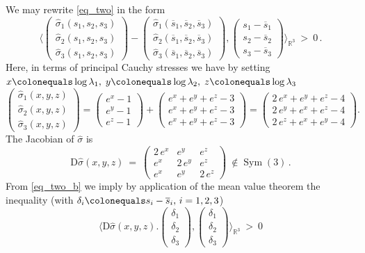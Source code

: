 \documentclass[10pt]{article}
\numberwithin{theoremCounter}{section}
\theoremstyle{plain}
\theoremstyle{definition}
\newcommand{\R}{\mathbb{R}}
\newcommand{\matr}[1]{\begin{pmatrix}#1\end{pmatrix}}
\newcommand{\DD}{\mathrm{D}}
\newcommand{\innerproduct}[1]{\langle #1 \rangle}
\newcommand{\iprod}{\innerproduct}
\DeclareMathOperator{\Sym}{Sym}
\numberwithin{equation}{section}
\begin{document}
\begin{appendix}
\begin{equation}
	 \end{equation}
We may rewrite \eqref{eq_two} in the form
	\begin{equation}\label{eq_two_b}
	\iprod{\matr{ \widehat\sigma_1(s_1,s_2,s_3)\\ \widehat\sigma_2(s_1,s_2,s_3)\\ \widehat\sigma_3(s_1,s_2,s_3)} - \matr{ \widehat\sigma_1(\overline s_1,\overline s_2,\overline s_3)\\ \widehat\sigma_2(\overline s_1,\overline s_2,\overline s_3)\\ \widehat\sigma_3(\overline s_1,\overline s_2,\overline s_3)} , \matr{s_1-\overline s_1 \\ s_2-\overline s_2 \\ s_3-\overline s_3} }_{\R^3}\ >\ 0\,.
	\end{equation}
Here, in terms of principal Cauchy stresses we have by setting $x\colonequals \log \lambda_1, \; y\colonequals \log \lambda_2, \; z\colonequals \log \lambda_3$
	\begin{equation}
	\begin{pmatrix} \widehat \sigma_1(x,y,z) \\ \widehat \sigma_2(x,y,z) \\ \widehat \sigma_3(x,y,z) \end{pmatrix} = \matr{e^x-1\\e^y-1\\e^z-1} + \matr{e^x + e^y + e^z - 3 \\ e^x + e^y + e^z - 3 \\ e^x + e^y + e^z - 3} = \matr{2\,e^x+e^y+e^z -4 \\ 2\,e^y + e^x+e^z - 4 \\ 2\,e^z + e^x+e^y - 4}.
	\end{equation}
The Jacobian of $ \widehat\sigma$ is
	\begin{equation}
	\DD \widehat\sigma(x,y,z)\ =\ \matr{ 2\,e^x & e^y & e^z \\ e^x & 2\,e^y & e^z \\ e^x & e^y & 2\,e^z}\ \not\in \Sym(3)\,.
	\end{equation}
From \eqref{eq_two_b} we imply by application of the mean value theorem the inequality (with $\delta_i \colonequals s_i - \overline s_i, \, i=1,2,3$)
	\begin{equation}\label{eq_three}
	\iprod{\DD \widehat\sigma(x,y,z) . \!\! \matr{\delta_1\\\delta_2\\\delta_3} \!,\! \matr{\delta_1\\\delta_2\\\delta_3}}_{\R^3}\ >\ 0

\end{equation}
\end{appendix}
\end{document}
